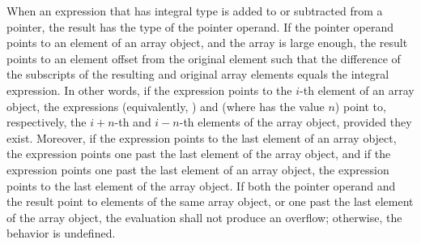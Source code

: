 \pnum
When an expression that has integral type is added to or subtracted from
a pointer, the result has the type of the pointer operand. If the
pointer operand points to an element of an array object, and the array
is large enough, the result points to an element offset from the
original element such that the difference of the subscripts of the
resulting and original array elements equals the integral expression. In
other words, if the expression  points to the $i$-th element of
an array object, the expressions  (equivalently,
) and  (where  has the value $n$)
point to, respectively, the $i+n$-th and $i-n$-th elements of the array
object, provided they exist. Moreover, if the expression 
points to the last element of an array object, the expression
 points one past the last element of the array object, and
if the expression  points one past the last element of an array
object, the expression  points to the last element of the
array object. If both the pointer operand and the result point to
elements of the same array object, or one past the last element of the
array object, the evaluation shall not produce an overflow; otherwise,
the behavior is undefined.

